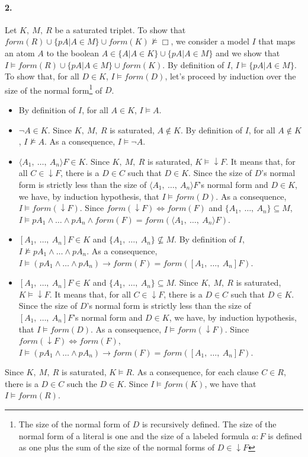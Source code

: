 \documentclass[a4paper,10pt]{article}
\newcommand{\F}{\mathit{form}}
\begin{document}
\paragraph{2.}
Let $K,\ M,\ R$ be a saturated triplet. To show that $\F(R)\cup\{pA|A\in M\}\cup\F(K)\nvDash\Box$,
we consider a model $I$ that maps an atom $A$ to  the boolean $A\in\{A|A\in K\}\cup\{pA|A\in M\}$
and we show that $I\vDash\F(R)\cup\{pA|A\in M\}\cup\F(K)$. By definition of $I$,
$I\vDash\{pA|A\in M\}$. To show that, for all $D\in K$, $I\vDash\F(D)$, let's proceed by induction
over the size of the normal form\footnote{The size of the normal form of $D$ is recursively
defined. The size of the normal form of a literal is one and the size of a labeled formula
$a:F$ is defined as one plus the sum of the size of the normal forms of $D\in\downarrow F$}
of $D$.
\begin{itemize}
 \item By definition of $I$, for all $A\in K$, $I\vDash A$.
 \item $\neg A\in K$. Since $K,\ M,\ R$ is saturated, $A\notin K$.
  By definition of $I$, for all $A\notin K$, $I\nvDash A$. As a consequence,  $I\vDash\neg A$.
 \item $\langle A_1,\ \dots,\ A_n\rangle F\in K$. Since $K,\ M,\ R$ is saturated,
$K\vDash\downarrow F$. It means that, for all $C\in\downarrow F$, there is a $D\in C$ such that
$D\in K$. Since the size of $D$'s normal form is strictly less than the size of
$\langle A_1,\ \dots,\ A_n\rangle F$'s normal form and $D\in K$, we have, by induction hypothesis,
that $I\vDash\F(D)$. As a consequence, $I\vDash\F(\downarrow F)$.
Since $\F(\downarrow F)\Leftrightarrow\F(F)$ and $\{A_1,\ \dots,\ A_n\}\subseteq M$,
$I\vDash pA_1\wedge\dots\wedge pA_n\wedge\F(F)=\F(\langle A_1,\ \dots,\ A_n\rangle F)$.
 \item $[A_1,\ \dots,\ A_n]F\in K$ and $\{A_1,\ \dots,\ A_n\}\nsubseteq M$. By definition of $I$,
$I\nvDash pA_1\wedge\dots\wedge pA_n$. As a consequence,
$I\vDash(pA_1\wedge\dots\wedge pA_n)\rightarrow\F(F)=\F([A_1,\ \dots,\ A_n]F)$.
 \item $[A_1,\ \dots,\ A_n]F\in K$ and $\{A_1,\ \dots,\ A_n\}\subseteq M$.
Since $K,\ M,\ R$ is saturated, $K\vDash\downarrow F$.
It means that, for all $C\in\downarrow F$, there is a $D\in C$ such that $D\in K$.
Since the size of $D$'s normal form is strictly less than the size of $[A_1,\ \dots,\ A_n]F$'s
normal form and $D\in K$, we have, by induction hypothesis, that $I\vDash\F(D)$.
As a consequence, $I\vDash\F(\downarrow F)$. Since $\F(\downarrow F)\Leftrightarrow\F(F)$,
$I\vDash(pA_1\wedge\dots\wedge pA_n)\rightarrow\F(F)=\F([A_1,\ \dots,\ A_n]F)$.
\end{itemize}
Since $K,\ M,\ R$ is saturated, $K\vDash R$. As a consequence, for each clause $C\in R$,
there is a $D\in C$ such the $D\in K$. Since $I\vDash\F(K)$, we have that $I\vDash\F(R)$.
\end{document}
